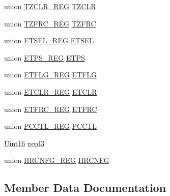 \begin{DoxyCompactItemize}
\item 
union \hyperlink{union_t_z_c_l_r___r_e_g}{T\+Z\+C\+L\+R\+\_\+\+R\+E\+G} \hyperlink{struct_e_p_w_m___r_e_g_s_a67e8b75caad0631d3c263a3cfd884a3c}{T\+Z\+C\+L\+R}
\item 
union \hyperlink{union_t_z_f_r_c___r_e_g}{T\+Z\+F\+R\+C\+\_\+\+R\+E\+G} \hyperlink{struct_e_p_w_m___r_e_g_s_accc1f186ccb71886f5d84c69c7421b35}{T\+Z\+F\+R\+C}
\item 
union \hyperlink{union_e_t_s_e_l___r_e_g}{E\+T\+S\+E\+L\+\_\+\+R\+E\+G} \hyperlink{struct_e_p_w_m___r_e_g_s_a343a26c30e6b348bc564337d2c0c0167}{E\+T\+S\+E\+L}
\item 
union \hyperlink{union_e_t_p_s___r_e_g}{E\+T\+P\+S\+\_\+\+R\+E\+G} \hyperlink{struct_e_p_w_m___r_e_g_s_a843058ba801bd7e4e70c3d108188f38d}{E\+T\+P\+S}
\item 
union \hyperlink{union_e_t_f_l_g___r_e_g}{E\+T\+F\+L\+G\+\_\+\+R\+E\+G} \hyperlink{struct_e_p_w_m___r_e_g_s_a3dcc373cd436c6be832e6d5a39a4e692}{E\+T\+F\+L\+G}
\item 
union \hyperlink{union_e_t_c_l_r___r_e_g}{E\+T\+C\+L\+R\+\_\+\+R\+E\+G} \hyperlink{struct_e_p_w_m___r_e_g_s_a7022fbbb508946105ef03222f8f68702}{E\+T\+C\+L\+R}
\item 
union \hyperlink{union_e_t_f_r_c___r_e_g}{E\+T\+F\+R\+C\+\_\+\+R\+E\+G} \hyperlink{struct_e_p_w_m___r_e_g_s_a2bade1e7c724464647f1fff9367da510}{E\+T\+F\+R\+C}
\item 
union \hyperlink{union_p_c_c_t_l___r_e_g}{P\+C\+C\+T\+L\+\_\+\+R\+E\+G} \hyperlink{struct_e_p_w_m___r_e_g_s_a8a4aa48748d9cb44eb93ee9490314f81}{P\+C\+C\+T\+L}
\item 
\hyperlink{_d_s_p2833x___device_8h_a59a9f6be4562c327cbfb4f7e8e18f08b}{Uint16} \hyperlink{struct_e_p_w_m___r_e_g_s_a28a3dc27810a8a494796fb0c0f9f0383}{rsvd3}
\item 
union \hyperlink{union_h_r_c_n_f_g___r_e_g}{H\+R\+C\+N\+F\+G\+\_\+\+R\+E\+G} \hyperlink{struct_e_p_w_m___r_e_g_s_a47b54ccbf421930459b459554ea7a8bc}{H\+R\+C\+N\+F\+G}
\end{DoxyCompactItemize}


\subsection{Member Data Documentation}
\hypertarget{struct_e_p_w_m___r_e_g_s_a72396e1c5f1dec68cda2da214766b8af}{}
